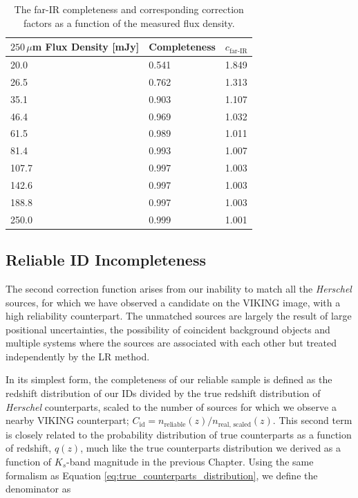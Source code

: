 \begin{table}
    \centering
    \begin{tabular}{p{5cm}|p{2.5cm}|p{2.5cm}}
        \hline
        \hline
        $250\,\mu$m Flux Density [mJy] & Completeness & $c_{\textrm{far-IR}}$ \\
        \hline
        \hline
        20.0 & 0.541 & 1.849 \\
        26.5 & 0.762 & 1.313 \\
        35.1 & 0.903 & 1.107 \\
        46.4 & 0.969 & 1.032 \\
        61.5 & 0.989 & 1.011 \\
        81.4 & 0.993 & 1.007 \\
        107.7 & 0.997 & 1.003 \\
        142.6 & 0.997 & 1.003 \\
        188.8 & 0.997 & 1.003 \\
        250.0 & 0.999 & 1.001 \\
        \hline
    \end{tabular}
    \caption[Far-IR catalogue completeness as a function of $250\,\mu$m flux density]{The far-IR completeness and corresponding correction factors as a function of the measured flux density.}
    \label{tab:submm_completeness_table}
\end{table}

\subsection{Reliable ID Incompleteness}

The second correction function arises from our inability to match all the \textit{Herschel} sources, for which we have observed a candidate on the VIKING image, with a high reliability counterpart. The unmatched sources are largely the result of large positional uncertainties, the possibility of coincident background objects and multiple systems where the sources are associated with each other but treated independently by the LR method.

In its simplest form, the completeness of our reliable sample is defined as the redshift distribution of our IDs divided by the true redshift distribution of \textit{Herschel} counterparts, scaled to the number of sources for which we observe a nearby VIKING counterpart; $C_{\textrm{id}} = n_{\textrm{reliable}}(z)/n_{\textrm{real, scaled}}(z)$. This second term is closely related to the probability distribution of true counterparts as a function of redshift, $q(z)$, much like the true counterparts distribution we derived as a function of $K_s$-band magnitude in the previous Chapter. Using the same formalism as Equation \ref{eq:true_counterparts_distribution}, we define the denominator as

